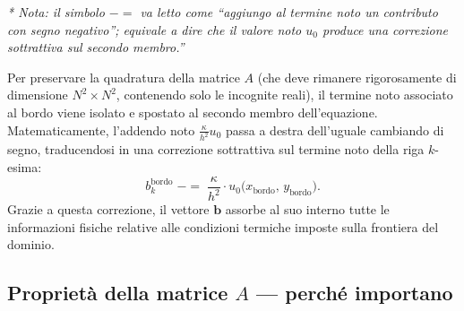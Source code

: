 \documentclass[a4paper,11pt]{article}
\theoremstyle{definition}
\begin{document}
\noindent\emph{* Nota: il simbolo $\mathrel{-}=$ va letto come “aggiungo al termine noto un contributo con segno negativo”; equivale a dire che il valore noto $u_0$ produce una correzione sottrattiva sul secondo membro.”}

Per preservare la quadratura della matrice $A$ (che deve rimanere rigorosamente di dimensione $N^2 \times N^2$, contenendo solo le incognite reali), il termine noto associato al bordo viene isolato e spostato al secondo membro dell'equazione. Matematicamente, l'addendo noto $\frac{\kappa}{h^2} u_0$ passa a destra dell'uguale cambiando di segno, traducendosi in una correzione sottrattiva sul termine noto della riga $k$-esima:
\[
  b_k^{\mathrm{bordo}} \;\mathrel{{-}{=}}\; \frac{\kappa}{h^2} \cdot u_0\!\bigl(x_{\text{bordo}},\, y_{\text{bordo}}\bigr).
\]
Grazie a questa correzione, il vettore $\mathbf{b}$ assorbe al suo interno tutte le informazioni fisiche relative alle condizioni termiche imposte sulla frontiera del dominio.


\subsection{Proprietà della matrice $A$ — perché importano}
\end{document}
